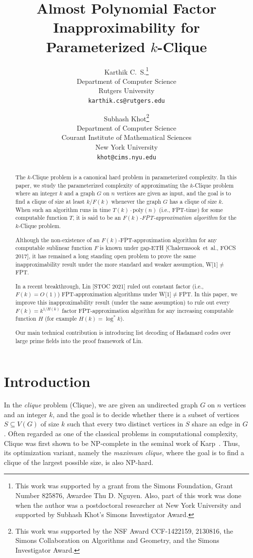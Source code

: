 \documentclass[11pt]{article}
\author{Karthik C.\ S.\footnote{This work was supported by a grant from the Simons Foundation, Grant Number 825876, Awardee Thu D. Nguyen. Also, part of this work was done when the author was a postdoctoral researcher at New York University and supported by Subhash Khot's Simons Investigator Award.}\\ Department of Computer Science\\ Rutgers University\\\texttt{karthik.cs@rutgers.edu} \and Subhash Khot\footnote{This work was supported by the NSF Award CCF-1422159,
2130816, the Simons Collaboration on Algorithms and Geometry, and the
Simons Investigator Award.
}\\ Department of Computer Science\\ Courant Institute of Mathematical
Sciences\\ New York University\\ \texttt{khot@cims.nyu.edu} }
\title{Almost Polynomial Factor Inapproximability for Parameterized $k$-Clique}
\date{}
\begin{document}
\maketitle

\begin{abstract} 
The $k$-Clique problem is a canonical hard problem in parameterized complexity. 
In this paper, we study the parameterized complexity of approximating the $k$-Clique  problem where an integer $k$ and a graph $G$ on $n$ vertices are given as input, and the goal is to find a clique of size at least $k/F(k)$ whenever the graph $G$ has a clique of size $k$. When such an algorithm runs in time $T(k) \cdot \text{poly}(n)$ (i.e., FPT-time) for some computable function $T$, it is said to be an \emph{$F(k)$-FPT-approximation algorithm} for the $k$-Clique problem. \vspace{0.1cm}

 

Although  the non-existence of an $F(k)$-FPT-approximation algorithm for any computable  sublinear function $F$ is known under gap-ETH [Chalermsook~et~al., FOCS 2017], it has remained a long standing open problem to prove the same inapproximability result under the more standard and weaker assumption, W[1]$\neq$FPT.\vspace{0.1cm}
 
In a recent breakthrough,  Lin [STOC 2021] ruled out  constant factor (i.e., $F(k)=O(1)$) FPT-approximation algorithms  under W[1]$\neq$FPT. In this paper, we improve this inapproximability result (under the same assumption) to rule out  every $F(k)=k^{1/H(k)}$ factor FPT-approximation algorithm for any increasing computable function $H$ (for example $H(k)=\log^\ast k$).   \vspace{0.1cm}


Our main technical contribution is introducing list decoding of Hadamard codes over large prime fields  into the proof framework of Lin. 
\end{abstract}
\clearpage

\section{Introduction}
In the {\em clique} problem (Clique), we are given an undirected graph $G$ on $n$ vertices and an integer $k$, and the goal is to decide whether there is a subset of vertices $S\subseteq V(G)$ of size $k$ such that every two distinct vertices in $S$ share an edge in $G$. 
%
Often regarded as one of the classical problems in computational complexity, Clique was first shown to be NP-complete in the seminal work of Karp~\cite{Karp72}. Thus, its optimization variant, namely the {\em maximum clique}, where the goal is to find a clique of the largest possible size, is also  NP-hard. 
\end{document}

